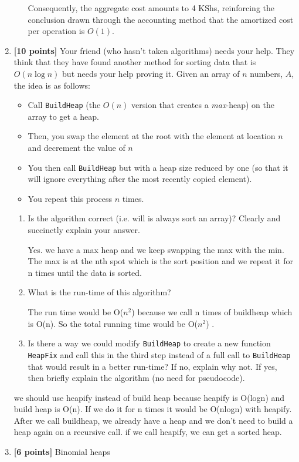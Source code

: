 \documentclass[11pt]{article}
\begin{document}
\begin{enumerate}
\begin{enumerate}
Consequently, the aggregate cost amounts to 4 KShs, reinforcing the conclusion drawn through the accounting method that the amortized cost per operation is \(O(1)\).
\end{enumerate} 

\item \textbf{[10 points]} Your friend (who hasn't taken algorithms) needs your help.  They think that they have found another method for sorting data that is $O(n \log n)$ but needs your help proving it.  Given an array of $n$ numbers, $A$, the idea is as follows:

\begin{itemize}
\item Call \texttt{BuildHeap} (the $O(n)$ version that creates a \emph{max}-heap) on the array to get a heap.
\item Then, you swap the element at the root with the element at location $n$ and decrement the value of $n$
\item You then call \texttt{BuildHeap} but with a heap size reduced by one (so that it will ignore everything after the most recently copied element).
\item You repeat this process $n$ times.
\end{itemize}

\begin{enumerate}
\item Is the algorithm correct (i.e. will is always sort an array)?  Clearly and succinctly explain your answer.

  Yes. we have a max heap and we keep swapping the max with the min. The max is at the nth spot which is the sort position and we repeat it for n times until the data is sorted.
        
\item What is the run-time of this algorithm?

The run time would be O($n^2$) because we call n times of  buildheap which is O(n). So the total running time would be O($n^2$) . 
\item Is there a way we could modify \texttt{BuildHeap} to create a new function \texttt{HeapFix} and call this in the third step instead of a full call to \texttt{BuildHeap} that would result in a better run-time?  If no, explain why not.  If yes, then briefly explain the algorithm (no need for pseudocode).

\end{enumerate}
we should use heapify instead of build heap because heapify is O(logn) and build heap is O(n). If we do it for n times it would be O(nlogn) with heapify.  After we call buildheap, we already have a heap and we don't need to build a heap again on a recursive call. if we call heapify, we can get a sorted heap.  
\item \textbf{[6 points]} Binomial heaps


\end{enumerate}
\end{document}
